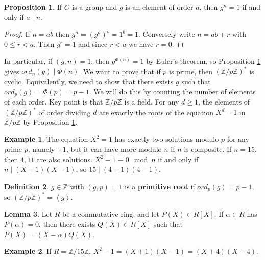 \documentclass{article}
\newcommand{\Z}{\mathbb{Z}}
\newcommand{\rb}[1]{\left( #1 \right)}
\renewcommand{\sb}[1]{\left[ #1 \right]}
\newcommand{\ab}[1]{\left\langle #1 \right\rangle}
\theoremstyle{definition}\newtheorem{definition}{Definition}
\theoremstyle{definition}\newtheorem*{remark}{Remark}
\theoremstyle{definition}\newtheorem*{example}{Example}
\theoremstyle{definition}\newtheorem*{note}{Note}
\newtheorem{proposition}[definition]{Proposition}
\newtheorem{lemma}[definition]{Lemma}
\begin{document}
\begin{proposition}
\label{prop:19}
If $ G $ is a group and $ g $ is an element of order $ a $, then $ g^n = 1 $ if and only if $ a \mid n $.
\end{proposition}

\begin{proof}
If $ n = ab $ then $ g^n = \rb{g^a}^b = 1^b = 1 $. Conversely write $ n = ab + r $ with $ 0 \le r < a $. Then $ g^r = 1 $ and since $ r < a $ we have $ r = 0 $.
\end{proof}

In particular, if $ \rb{g, n} = 1 $, then $ g^{\Phi\rb{n}} = 1 $ by Euler's theorem, so Proposition \ref{prop:19} gives $ ord_n\rb{g} \mid \Phi\rb{n} $. We want to prove that if $ p $ is prime, then $ \rb{\Z / p\Z}^* $ is cyclic. Equivalently, we need to show that there exists $ g $ such that $ ord_p\rb{g} = \Phi\rb{p} = p - 1 $. We will do this by counting the number of elements of each order. Key point is that $ \Z / p\Z $ is a field. For any $ d \ge 1 $, the elements of $ \rb{\Z / p\Z}^* $ of order dividing $ d $ are exactly the roots of the equation $ X^d - 1 $ in $ \Z / p\Z $ by Proposition \ref{prop:19}.

\begin{example}
The equation $ X^2 = 1 $ has exactly two solutions modulo $ p $ for any prime $ p $, namely $ \pm 1 $, but it can have more modulo $ n $ if $ n $ is composite. If $ n = 15 $, then $ 4, 11 $ are also solutions. $ X^2 - 1 \equiv 0 \mod n $ if and only if $ n \mid \rb{X + 1}\rb{X - 1} $, so $ 15 \mid \rb{4 + 1}\rb{4 - 1} $.
\end{example}

\begin{definition}
$ g \in \Z $ with $ \rb{g, p} = 1 $ is a \textbf{primitive root} if $ ord_p\rb{g} = p - 1 $, so $ \rb{\Z / p\Z}^* = \ab{g} $.
\end{definition}

\begin{lemma}
\label{lem:21}
Let $ R $ be a commutative ring, and let $ P\rb{X} \in R\sb{X} $. If $ \alpha \in R $ has $ P\rb{\alpha} = 0 $, then there exists $ Q\rb{X} \in R\sb{X} $ such that $ P\rb{X} = \rb{X - \alpha}Q\rb{X} $.
\end{lemma}

\begin{example}
If $ R = \Z / 15\Z $, $ X^2 - 1 = \rb{X + 1}\rb{X - 1} = \rb{X + 4}\rb{X - 4} $.
\end{example}
\end{document}
